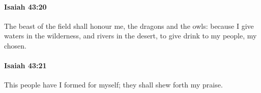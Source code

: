 		\paragraph{Isaiah 43:20} %
			\label{ISAIAH-43-20}

			The beast of the field shall honour me, the dragons and the owls: because I give waters in the wilderness, and rivers in the desert, to give drink to my people, my chosen.


		\paragraph{Isaiah 43:21} %
			\label{ISAIAH-43-21}

			This people have I formed for myself; they shall shew forth my praise.



